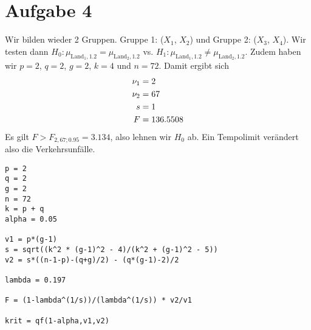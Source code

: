 \documentclass{article}
\begin{document}
	\section*{Aufgabe 4}
	Wir bilden wieder 2 Gruppen. Gruppe 1: ($X_1$, $X_2$) und Gruppe 2: ($X_3$, $X_4$). Wir testen dann $H_0: \mu_{\text{Land}_1,1.2} = \mu_{\text{Land}_2,1.2}$ vs. $H_1: \mu_{\text{Land}_1,1.2} \neq \mu_{\text{Land}_2,1.2}$. Zudem haben wir $p=2$, $q=2$, $g=2$, $k=4$ und $n=72$. Damit ergibt sich
	\begin{align}
		\nu_1 &= 2 \notag \\
		\nu_2 &= 67 \notag \\
		s &= 1 \notag \\
		F &= 136.5508 \notag
	\end{align}
	Es gilt $F > F_{2,67;0.95}=3.134$, also lehnen wir $H_0$ ab. Ein Tempolimit verändert also die Verkehrsunfälle.
	\begin{lstlisting}[style=R]
p = 2
q = 2
g = 2
n = 72
k = p + q
alpha = 0.05

v1 = p*(g-1)
s = sqrt((k^2 * (g-1)^2 - 4)/(k^2 + (g-1)^2 - 5))
v2 = s*((n-1-p)-(q+g)/2) - (q*(g-1)-2)/2

lambda = 0.197

F = (1-lambda^(1/s))/(lambda^(1/s)) * v2/v1

krit = qf(1-alpha,v1,v2)
	\end{lstlisting}
	
\end{document}
